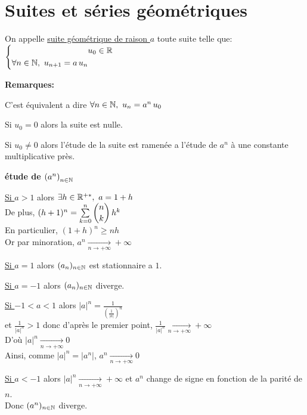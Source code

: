 \documentclass[12pt,twoside,a4paper]{article}
\author{MPSI 2}
\begin{document}
	\maketitle
	\section{Suites et s\'eries g\'eom\'etriques}
		\begin{defi}
			On appelle \underline{suite g\'eom\'etrique de raison $a$} toute suite telle que:\\
			$\systeme{&u_0\in\R\\\forall n\in\N,\ u_{n+1}=a\,u_n}$
		\end{defi}
		\begin{flushleft}
			\textbf{Remarques:}
			\begin{liste}
				\item C'est \'equivalent a dire $\forall n\in\N,\ u_n=a^n\,u_0$
				\item Si $u_0=0$ alors la suite est nulle.
				\item Si $u_0\neq 0$ alors l'\'etude de la suite est ramen\'ee a l'\'etude de $a^n$ \`a une constante multiplicative pr\`es.
			\end{liste}
		\end{flushleft}
		\begin{flushleft}
			\textbf{\'etude de $\left(a^n\right)_{n\in\mathbb{N}}$}
			\begin{liste}
				\item \underline{Si $a>1$} alors $\exists h\in\R^{+*},\ a=1+h$\\
					De plus, $(h+1)^n=\sum\limits_{k=0}^{n}\dbinom{n}{k}\,h^k$\\
					En particulier, $(1+h)^n\geqslant nh$\\
					Or par minoration, $a^n\mathop{\longrightarrow}\limits_{n\rightarrow+\infty}+\infty$
				\item \underline{Si $a=1$} alors $(a_n)_{n\in\mathbb{N}}$ est stationnaire a $1$.
				\item \underline{Si $a=-1$} alors $(a_n)_{n\in\mathbb{N}}$ diverge.
				\item \underline{Si $-1<a<1$} alors $|a|^n=\frac{1}{\left(\frac{1}{|a|}\right)^n}$\\
					et $\frac{1}{|a|^n}>1$ donc d'apr\`es le premier point, $\frac1{|a|^n}\mathop{\longrightarrow}\limits_{n\rightarrow+\infty}+\infty$\\
					D'o\`u $|a|^n\mathop{\longrightarrow}\limits_{n\rightarrow+\infty}0$\\
					Ainsi, comme $|a|^n=|a^n|$, $a^n\mathop{\longrightarrow}\limits_{n\rightarrow+\infty}0$
				\item \underline{Si $a<-1$} alors $|a|^n\mathop{\longrightarrow}\limits_{n\rightarrow+\infty}+\infty$ et $a^n$ change de signe en fonction de la parit\'e de $n$.\\
					Donc $(a^n)_{n\in\mathbb{N}}$ diverge.
			\end{liste}
		\end{flushleft}
\end{document}
